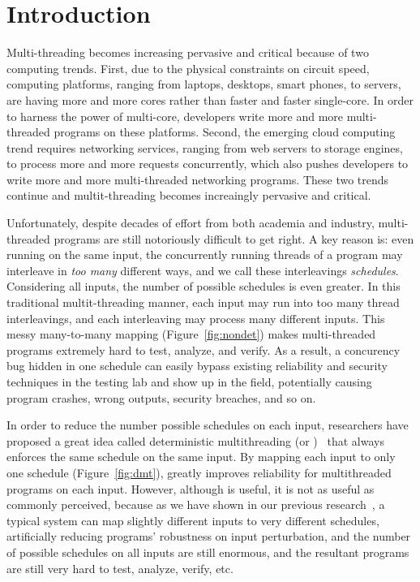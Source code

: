 \section{Introduction} \label{ch:intro}

Multi-threading becomes increasing pervasive and critical because of two 
computing trends. First, due to the physical constraints on circuit speed, 
computing platforms, ranging from laptops, desktops, smart phones, to servers, are having
more and more cores rather than faster and faster single-core. In order to 
harness the power of multi-core, developers write more and more multi-threaded programs on these platforms. 
Second, the emerging cloud computing trend requires networking services, ranging from 
web servers to storage engines, to process more and more requests concurrently, which also 
pushes developers to write more and more multi-threaded networking programs. These two trends continue and 
multit-threading becomes increaingly pervasive and critical.

Unfortunately, despite decades of effort from both academia and industry, 
multi-threaded programs are still notoriously difficult to get right. A key 
reason is: even running on the same input, the concurrently running threads of 
a program may interleave in \emph{too many} different ways, and we call these interleavings 
\emph{schedules}. Considering all inputs, the number of possible schedules is even greater. 
In this traditional multit-threading manner, each input may run into too many 
thread interleavings, and each interleaving may process many different inputs.
This messy many-to-many mapping (Figure~\ref{fig:nondet}) makes multi-threaded programs extremely
hard to test, analyze, and verify. As a result, a concurency bug hidden in one schedule can 
easily bypass existing reliability and security techniques in the testing lab and show up in the field, 
potentially causing program crashes, wrong outputs, security breaches, and so on.

In order to reduce the number possible schedules on each input, researchers 
have proposed a great idea called deterministic multithreading (or \dmt)~\cite{dthreads:sosp11,
dpj:oopsla09, dmp:asplos09, kendo:asplos09, coredet:asplos10} that 
always enforces the same schedule on the same input. By mapping each input to only 
one schedule (Figure~\ref{fig:dmt}), \dmt greatly improves reliability for multithreaded programs on each input.
However, although \dmt is useful, it is not as useful as commonly perceived, 
because as we have shown in our previous research~\cite{cui:tern:osdi10},
a typical \dmt system can map slightly different inputs to 
very different schedules, artificially reducing programs' robustness on input 
perturbation, and the number of possible schedules on all inputs are still 
enormous, and the resultant programs are still very hard to test, analyze, verify, etc.


